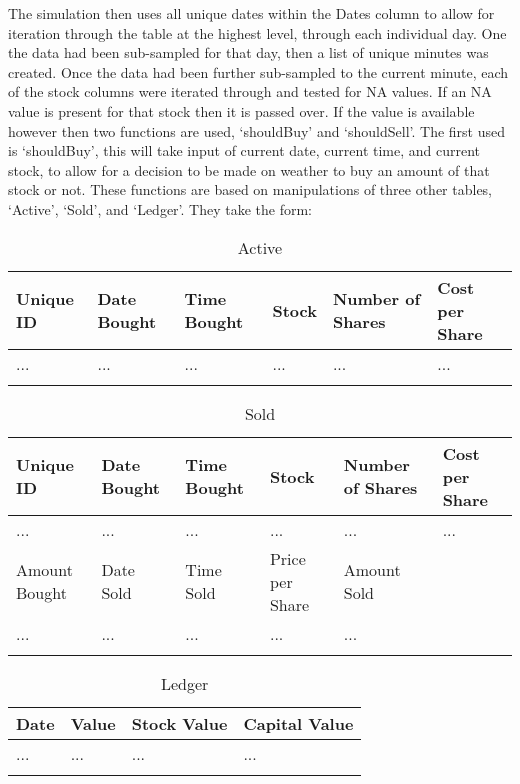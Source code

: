 \documentclass[12pt,a4paper]{article}
\begin{document}
The simulation then uses all unique dates within the Dates column to allow for iteration through the table at the highest level, through each individual day. One the data had been sub-sampled for that day, then a list of unique minutes was created. Once the data had been further sub-sampled to the current minute, each of the stock columns were iterated through and tested for NA values. If an NA value is present for that stock then it is passed over. If the value is available however then two functions are used, `shouldBuy' and `shouldSell'. The first used is `shouldBuy', this will take input of current date, current time, and current stock, to allow for a decision to be made on weather to buy an amount of that stock or not. These functions are based on manipulations of three other tables, `Active', `Sold', and `Ledger'. They take the form:

\label{units}
\begin{longtable}{ |p{2.25cm}|p{2.25cm}|p{2.25cm}|p{2.25cm}|p{2.25cm}|p{2.25cm}| }\hline\hline
Unique ID & Date Bought & Time Bought & Stock & Number of Shares & Cost per Share \\ \hline
... & ... & ... & ... & ... & ... \\ \hline
\caption{Active}
\end{longtable}

\label{units}
\begin{longtable}{ |p{2.25cm}|p{2.25cm}|p{2.25cm}|p{2.25cm}|p{2.25cm}|p{2.25cm}| }\hline\hline
Unique ID & Date Bought & Time Bought & Stock & Number of Shares & Cost per Share \\ \hline
... & ... & ... & ... & ... & ... \\ \hline
Amount Bought & Date Sold & Time Sold & Price per Share & Amount Sold & \\ \hline
... & ... & ... & ... & ... &  \\ \hline
\caption{Sold}
\end{longtable}

\label{units}
\begin{longtable}{ |p{2.25cm}|p{2.25cm}|p{2.25cm}|p{2.25cm}| }\hline\hline
Date & Value & Stock Value & Capital Value \\ \hline
... & ... & ... & ...  \\ \hline
\caption{Ledger}
\end{longtable}
\end{document}
